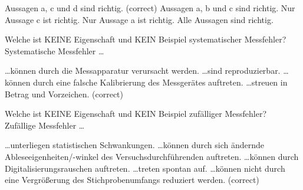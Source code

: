\documentclass[11pt]{exam}
\begin{document}
\begin{questions}
\begin{choices}
	\choice Aussagen a, c und d sind richtig. (correct)
	\choice Aussagen a, b und c sind richtig.
	\choice Nur Aussage c ist richtig.
	\choice Nur Aussage a ist richtig.
	\choice Alle Aussagen sind richtig.
\end{choices}



\newpage

\vspace{12mm}\question Welche ist KEINE Eigenschaft und KEIN Beispiel systematischer Messfehler? \\
Systematische Messfehler \dots \\

\begin{choices}
	\choice \dots können durch die Messapparatur verursacht werden.
	\choice \dots sind reproduzierbar.
	\choice \dots können durch eine falsche Kalibrierung des Messgerätes auftreten.
	\choice \dots streuen in Betrag und Vorzeichen. (correct)
\end{choices}


\vspace{12mm}\question Welche ist KEINE Eigenschaft und KEIN Beispiel zufälliger Messfehler? \\
Zufällige Messfehler \dots \\

\begin{choices}
	\choice \dots unterliegen statistischen Schwankungen.
	\choice \dots können durch sich ändernde Ableseeigenheiten/-winkel des Versuchsdurchführenden auftreten.
	\choice \dots können durch Digitalisierungsrauschen auftreten.
	\choice \dots treten spontan auf.
	\choice \dots können nicht durch eine Vergrößerung des Stichprobenumfangs reduziert werden. (correct)
\end{choices}

\vspace{3mm}\end{questions}
\end{document}
